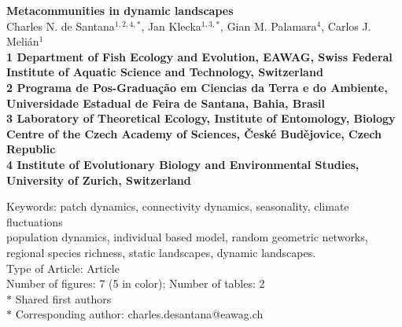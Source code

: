 \documentclass[12pt]{article}
\date{}
\begin{document}
\begin{flushleft}
{\Large
\textbf{Metacommunities in dynamic landscapes}
}
\\
\vspace{1.0cm} Charles N. de Santana$^{1,2,4,\ast}$, Jan
Klecka$^{1,3,\ast}$, Gian M. Palamara$^{4}$, Carlos J. Meli\'an$^{1}$
\\
\vspace{1.0cm} \bf{1} Department of Fish Ecology and Evolution, EAWAG,
Swiss Federal Institute of Aquatic Science and Technology, Switzerland
\\
\bf{2} Programa de Pos-Graduaç\~{a}o em Ciencias da Terra e do Ambiente,
Universidade Estadual de Feira de Santana, Bahia, Brasil
\\
\bf{3} Laboratory of Theoretical Ecology, Institute of Entomology,
Biology Centre of the Czech Academy of Sciences, \v{C}esk\'{e}
Bud\v{e}jovice, Czech Republic\\
\bf{4} Institute of Evolutionary Biology and Environmental Studies, University of Zurich, Switzerland\\
  \vspace{0.5 in}
  
  Keywords: patch dynamics, connectivity dynamics, seasonality, climate fluctuations\\
  population dynamics, individual based model, random geometric networks,\\
  regional species richness, static landscapes, dynamic landscapes.\\
  Type of Article: Article\\
  Number of figures: 7 (5 in color); Number of tables: 2\\
$\ast$ Shared first authors\\
$\ast$ Corresponding author: charles.desantana@eawag.ch\\
\end{flushleft}

\newpage
\end{document}
